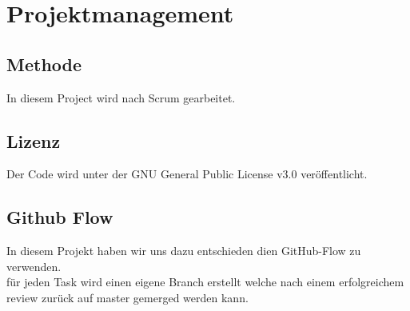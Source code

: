 \chapter{Projektmanagement}\label{ch:projektmanagement}

\section{Methode}\label{sec:methode}

In diesem Project wird nach Scrum gearbeitet.

\section{Lizenz}\label{sec:lizens}

Der Code wird unter der GNU General Public License v3.0 veröffentlicht.


\section{Github Flow}\label{sec:github-flow}

In diesem Projekt haben wir uns dazu entschieden dien GitHub-Flow zu verwenden.\\
\dah für jeden Task wird einen eigene Branch erstellt welche nach einem erfolgreichem review zurück auf master gemerged werden kann.

